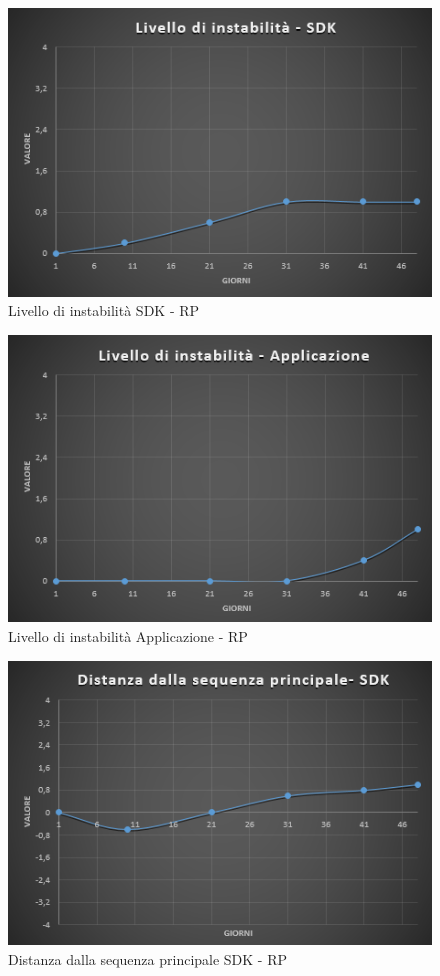 \begin{figure}[H]
	\centering 
	\includegraphics[scale=0.6]{Sezioni/Immagini/LivelloInstabilitaSDK-RP}
	\caption{Livello di instabilità SDK - RP}
\end{figure}

\begin{figure}[H]
	\centering 
	\includegraphics[scale=0.6]{Sezioni/Immagini/LivelloInstabilitaApp-RP}
	\caption{Livello di instabilità Applicazione - RP}
\end{figure}

\begin{figure}[H]
	\centering 
	\includegraphics[scale=0.6]{Sezioni/Immagini/DistanzaSDK-RP}
	\caption{Distanza dalla sequenza principale SDK - RP}
\end{figure}

